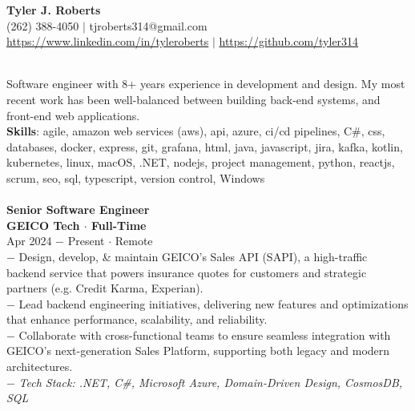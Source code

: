 \documentclass{resume}
\begin{document}
\begin{center}
{\LARGE \bf Tyler J. Roberts} \\[1mm]
\footnotesize
(262) 388-4050 $|$
tjroberts314@gmail.com \\[1mm]
\href{https://www.linkedin.com/in/tyleroberts}{https://www.linkedin.com/in/tyleroberts} $|$
\href{https://github.com/tyler314}{https://github.com/tyler314}
\end{center}
\begin{flushleft}

 \\[2mm]
{
	\scriptsize
	\tab Software engineer with 8+ years experience in  development and design. My most recent work has been well-balanced between building back-end systems, and front-end  web applications.\\[2mm]
	\scriptsize
	\textbf{Skills}: agile, amazon web services (aws), api, azure, ci/cd pipelines, C\#, css, databases, docker, express, git, grafana, html, java, javascript, jira, kafka, kotlin, kubernetes, linux, macOS, .NET, nodejs, project management, python, reactjs, scrum, seo, sql, typescript, version control, Windows
	\\[2mm]
}
\\[2mm]

\footnotesize{\bf Senior Software Engineer}\\
\footnotesize{\bf GEICO Tech $\cdot$ Full-Time}\\
\footnotesize{Apr 2024 $-$ Present $\cdot$ Remote}\\[1mm]
{\scriptsize
	$-$ Design, develop, \& maintain GEICO’s Sales API (SAPI), a high-traffic backend service that powers insurance quotes for customers and strategic partners (e.g. Credit Karma, Experian).\\
	$-$ Lead backend engineering initiatives, delivering new features and optimizations that enhance performance, scalability, and reliability.\\
	$-$ Collaborate with cross-functional teams to ensure seamless integration with GEICO’s next-generation Sales Platform, supporting both legacy and modern architectures.\\
	$-$ \textit{Tech Stack: .NET, C\#, Microsoft Azure, Domain-Driven Design, CosmosDB, SQL}
}\\[3mm]


\end{flushleft}
\end{document}
